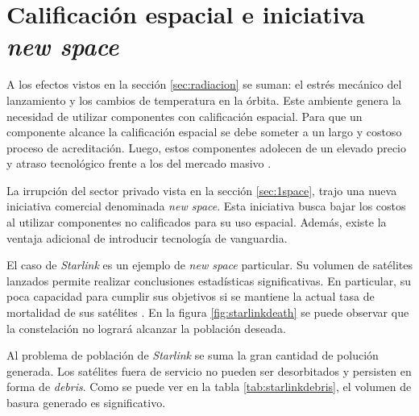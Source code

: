 \section{Calificación espacial e iniciativa \emph{new space}}
\label{sec:newspace}

A los efectos vistos en la sección \ref{sec:radiacion} se suman: el estrés mecánico del lanzamiento y los cambios de temperatura en la órbita.
Este ambiente genera la necesidad de utilizar componentes con calificación espacial.
Para que un componente alcance la calificación espacial se debe someter a un largo y costoso proceso de acreditación.
Luego, estos componentes adolecen de un elevado precio y atraso tecnológico frente a los del mercado masivo \citep{ARTICLE:negocio}.

La irrupción del sector privado vista en la sección \ref{sec:1space}, trajo una nueva iniciativa comercial denominada \emph{new space}.
Esta iniciativa busca bajar los costos al utilizar componentes no calificados para su uso espacial.
Además, existe la ventaja adicional de introducir tecnología de vanguardia.


El caso de \emph{Starlink} es un ejemplo de \emph{new space} particular.
Su volumen de satélites lanzados permite realizar conclusiones estadísticas significativas.
En particular, su poca capacidad para cumplir sus objetivos si se mantiene la actual tasa de mortalidad de sus satélites \citep{ARTICLE:cibils}.
En la figura \ref{fig:starlinkdeath} se puede observar que la constelación no logrará alcanzar la población deseada.
 
Al problema de población de \emph{Starlink} se suma la gran cantidad de polución generada.
Los satélites fuera de servicio no pueden ser desorbitados y persisten en forma de \emph{debris}.
Como se puede ver en la tabla \ref{tab:starlinkdebris}, el volumen de basura generado es significativo.

